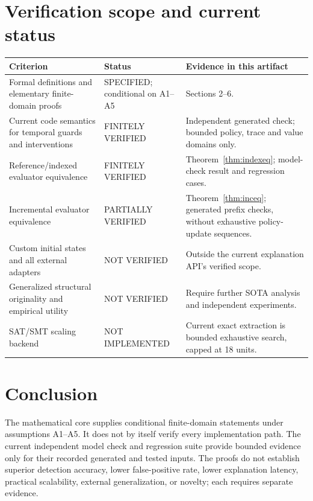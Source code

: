 \documentclass[11pt]{article}
\theoremstyle{remark}
\begin{document}
\section{Verification scope and current status}

\begin{longtable}{p{8.0cm}p{2.4cm}p{3.2cm}}
\toprule
Criterion & Status & Evidence in this artifact \\
\midrule
Formal definitions and elementary finite-domain proofs & SPECIFIED; conditional on A1--A5 & Sections 2--6.\\
Current code semantics for temporal guards and interventions & FINITELY VERIFIED & Independent generated check; bounded policy, trace and value domains only.\\
Reference/indexed evaluator equivalence & FINITELY VERIFIED & Theorem~\ref{thm:indexeq}; model-check result and regression cases.\\
Incremental evaluator equivalence & PARTIALLY VERIFIED & Theorem~\ref{thm:inceq}; generated prefix checks, without exhaustive policy-update sequences.\\
Custom initial states and all external adapters & NOT VERIFIED & Outside the current explanation API's verified scope.\\
Generalized structural originality and empirical utility & NOT VERIFIED & Require further SOTA analysis and independent experiments.\\
SAT/SMT scaling backend & NOT IMPLEMENTED & Current exact extraction is bounded exhaustive search, capped at 18 units.\\
\bottomrule
\end{longtable}

\section*{Conclusion}
The mathematical core supplies conditional finite-domain statements under assumptions A1--A5. It does not by itself verify every implementation path. The current independent model check and regression suite provide bounded evidence only for their recorded generated and tested inputs. The proofs do not establish superior detection accuracy, lower false-positive rate, lower explanation latency, practical scalability, external generalization, or novelty; each requires separate evidence.



\end{document}
